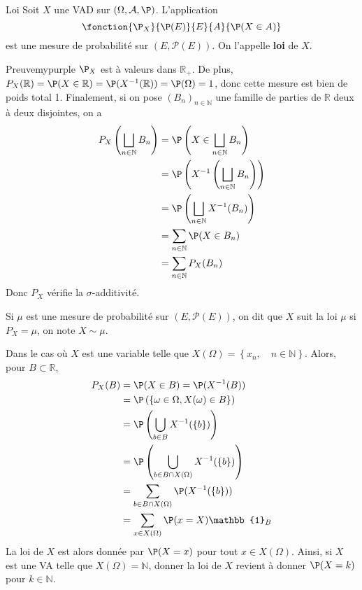     \begin{defitheo}{Loi}{}
        Soit $X$ une VAD sur $(\Omega, \mathcal{A}, \P)$. L’application 
        \[ \fonction{\P_X}{\P(E)}{E}{A}{\P(X \in A)} \]   
        est une mesure de probabilité sur $(E, \mathcal{P}(E))$. On l’appelle \textbf{loi} de $X$.
    \end{defitheo}

    \begin{demo}{Preuve}{mypurple}
        $\P_X$ est à valeurs dans $\mathbb{R}_+$. De plus, $P_X(\mathbb{R}) = \P(X \in \mathbb{R}) = \P(X^{-1}(\mathbb{R})) = \P(\Omega) = 1$, donc cette mesure est bien de poids total 1. Finalement, si on pose $(B_n)_{n \in \mathbb{N}}$ une famille de parties de $\mathbb{R}$ deux à deux disjointes, on a 
        \begin{align*}
            P_X\left(\bigsqcup_{n \in \mathbb{N}} B_n\right) &= \P\left(X \in \bigsqcup_{n \in \mathbb{N}} B_n\right) \\
            &= \P\left(X^{-1}\left(\bigsqcup_{n \in \mathbb{N}} B_n\right)\right) \\
            &= \P\left(\bigsqcup_{n \in \mathbb{N}} X^{-1}(B_n)  \right) \\
            &= \sum_{n \in \mathbb{N}} \P(X \in B_n) \\
            &= \sum_{n \in \mathbb{N}} P_X(B_n)
        \end{align*}
        Donc $P_X$ vérifie la $\sigma$-additivité.
    \end{demo}

    Si $\mu$ est une mesure de probabilité sur $(E, \mathcal{P}(E))$, on dit que $X$ suit la loi $\mu$ si $P_X = \mu$, on note $X \sim \mu$.

    Dans le cas où $X$ est une variable telle que $X(\Omega) = \left\{x_n, \quad n \in \mathbb{N}\right\}$. Alors, pour $B \subset \mathbb{R}$, 
    \begin{align*}
        P_X(B) &= \P(X \in B) = \P(X^{-1}(B)) \\
        &= \P\left(\left\{\omega \in \Omega, X(\omega) \in B\right\}\right) \\
        &= \P\left(\bigcup_{b \in B} X^{-1}(\left\{b\right\})\right) \\
        &= \P\left(\bigcup_{b \in B \cap X(\Omega)} X^{-1}(\left\{b\right\})\right) \\
        &= \sum_{b \in B \cap X(\Omega)} \P(X^{-1}(\left\{b\right\})) \\
        &= \sum_{x \in X(\Omega)} \P(x = X) \mathbb{1}_B 
    \end{align*}
    La loi de $X$ est alors donnée par $\P(X = x)$ pour tout $x \in X(\Omega)$. Ainsi, si $X$ est une VA telle que $X(\Omega) = \mathbb{N}$, donner la loi de $X$ revient à donner $\P(X = k)$ pour $k \in \mathbb{N}$.

